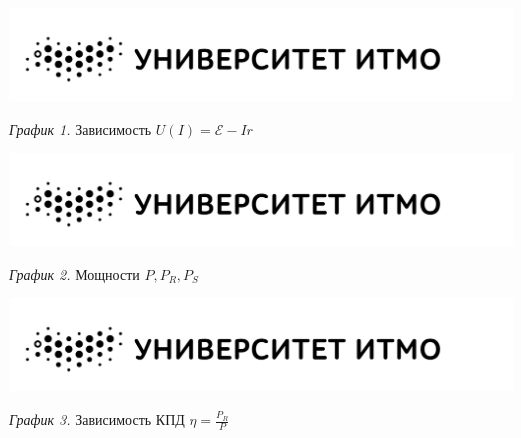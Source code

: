 \hypertarget{diagram1}{}

\begin{center}
    \includegraphics[width=15cm]{images/logo}

    \smallvspace

    \textit{График 1.} Зависимость $U(I) = \mathcal{E} - Ir$
\end{center}

\begin{center}
    \includegraphics[width=15cm]{images/logo}

    \smallvspace

    \textit{График 2.} Мощности $P, P_R, P_S$
\end{center}

\begin{center}
    \includegraphics[width=15cm]{images/logo}

    \smallvspace

    \textit{График 3.} Зависимость КПД $\eta = \frac{P_R}{P}$
\end{center}
